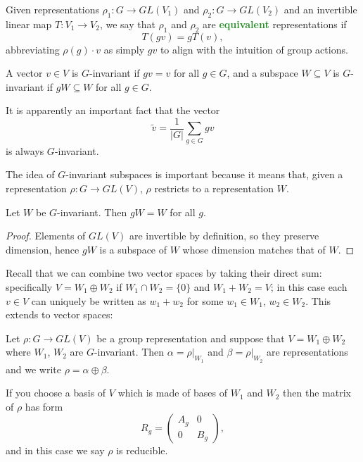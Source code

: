 \documentclass[10pt]{scrartcl}
\providecommand{\vocab}[1]{{\textbf{\textcolor{ForestGreen}{#1}}}}
\begin{document}
\begin{definition}
	Given representations $\rho_1\colon G\to GL(V_1)$ and
	$\rho_2\colon G\to GL(V_2)$ and an invertible linear map
	$T\colon V_1\to V_2$, we say that $\rho_1$ and $\rho_2$
	are \vocab{equivalent} representations if
	\[T(gv) = gT(v),\]
	abbreviating $\rho(g)\cdot v$ as simply $gv$
	to align with the intuition of group actions.
\end{definition}

\begin{definition}
	A vector $v\in V$ is $G$-invariant if $gv = v$ for all $g\in G$,
	and a subspace $W\subseteq V$ is $G$-invariant if
	$gW\subseteq W$ for all $g\in G$.
\end{definition}

\begin{example}
	It is apparently an important fact that the vector
	\[\tilde{v} = \frac{1}{|G|}\sum_{g\in G} gv\]
	is always $G$-invariant.
\end{example}

The idea of $G$-invariant subspaces is important because it means that,
given a representation $\rho\colon G\to GL(V)$,
$\rho$ restricts to a representation $W$.

\begin{lemma}
	Let $W$ be $G$-invariant. Then $gW = W$ for all $g$.
\end{lemma}

\begin{proof}
	Elements of $GL(V)$ are invertible by definition,
	so they preserve dimension, hence $gW$ is a subspace of $W$
	whose dimension matches that of $W$.
\end{proof}

Recall that we can combine two vector spaces by taking their direct sum:
specifically $V = W_1\oplus W_2$ if $W_1\cap W_2 = \{0\}$ and
$W_1 + W_2 = V$; in this case each $v\in V$ can uniquely be written as
$w_1 + w_2$ for some $w_1\in W_1$, $w_2\in W_2$.
This extends to vector spaces:

\begin{definition}
	Let $\rho\colon G\to GL(V)$ be a group representation
	and suppose that $V = W_1\oplus W_2$ where $W_1$, $W_2$ are $G$-invariant.
	Then $\alpha = \rho|_{W_1}$ and $\beta = \rho|_{W_2}$ are representations
	and we write $\rho = \alpha\oplus\beta$.
\end{definition}

If you choose a basis of $V$ which is made of bases of $W_1$ and $W_2$
then the matrix of $\rho$ has form
\[R_g = \begin{pmatrix}
	A_g & 0\\
	0 & B_g
\end{pmatrix},\]
and in this case we say $\rho$ is reducible.
\end{document}
